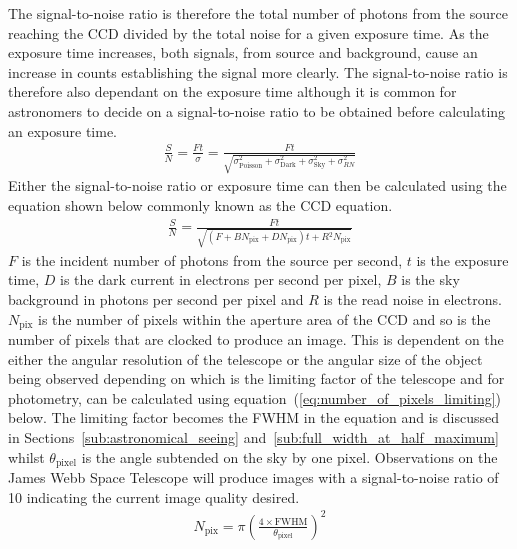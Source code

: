 		The signal-to-noise ratio is therefore the total number of photons from the source reaching the CCD divided by the total noise for a given exposure time. As the exposure time increases, both signals, from source and background, cause an increase in counts establishing the signal more clearly. The signal-to-noise ratio is therefore also dependant on the exposure time although it is common for astronomers to decide on a signal-to-noise ratio to be obtained before calculating an exposure time.
		\begin{align}
			\frac{S}{N} = \frac{Ft}{\sigma} =\frac{Ft}{\sqrt{\sigma_\text{Poisson}^{2} + \sigma_\text{Dark}^{2} + \sigma_\text{Sky}^{2} + \sigma_{RN}^{2}}}
		\end{align}
		Either the signal-to-noise ratio or exposure time can then be calculated using the equation shown below commonly known as the CCD equation.
		\begin{align}
			\frac{S}{N} = \frac{Ft}{\sqrt{(F + BN_\text{pix} + DN_\text{pix})t + R{^2}N_\text{pix}}}
		\end{align}
		$F$ is the incident number of photons from the source per second, $t$ is the exposure time, $D$ is the dark current in electrons per second per pixel, $B$ is the sky background in photons per second per pixel and $R$ is the read noise in electrons. $N_\text{pix}$ is the number of pixels within the aperture area of the CCD and so is the number of pixels that are clocked to produce an image. This is dependent on the either the angular resolution of the telescope or the angular size of the object being observed depending on which is the limiting factor of the telescope and for photometry, can be calculated using equation~(\ref{eq:number_of_pixels_limiting}) below. The limiting factor becomes the FWHM in the equation and is discussed in Sections~\ref{sub:astronomical_seeing} and~\ref{sub:full_width_at_half_maximum} whilst $\theta_\text{pixel}$ is the angle subtended on the sky by one pixel. Observations on the James Webb Space Telescope will produce images with a signal-to-noise ratio of 10 indicating the current image quality desired.
		\begin{align}
			N_\text{pix} = \pi \left(\frac{4 \times \text{FWHM}}{\theta_\text{pixel}}\right)^2 \label{eq:number_of_pixels_limiting}
		\end{align}
